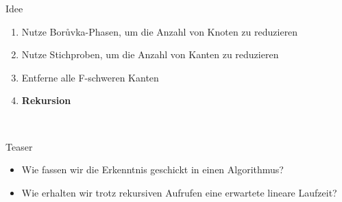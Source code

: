 \documentclass[10pt]{beamer}
\begin{document}
\begin{frame}{Idee}
    \begin{enumerate}
        \item Nutze Bor\r uvka-Phasen, um die Anzahl von Knoten zu reduzieren
        \item Nutze Stichproben, um die Anzahl von Kanten zu reduzieren
        \item Entferne alle F-schweren Kanten
        \item \textbf{Rekursion}
    \end{enumerate}\\
\end{frame}
\begin{frame}{Teaser}
    \begin{itemize}
        \item Wie fassen wir die Erkenntnis geschickt in einen Algorithmus?
        \item Wie erhalten wir trotz rekursiven Aufrufen eine erwartete lineare
              Laufzeit?
    \end{itemize}
\end{frame}
\end{document}
